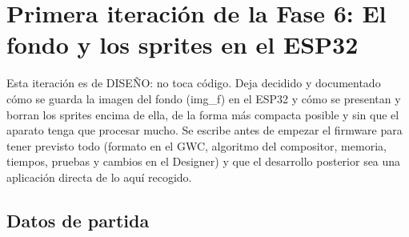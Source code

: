 \section{Primera iteración de la Fase 6: El fondo y los sprites en el ESP32}
\label{sec:F6I01}

Esta iteración es de DISEÑO: no toca código. Deja decidido y documentado cómo se guarda la imagen del fondo (img\_f) en el ESP32 y cómo se presentan y borran los sprites encima de ella, de la forma más compacta posible y sin que el aparato tenga que procesar mucho. Se escribe antes de empezar el firmware para tener previsto todo (formato en el GWC, algoritmo del compositor, memoria, tiempos, pruebas y cambios en el Designer) y que el desarrollo posterior sea una aplicación directa de lo aquí recogido.

\subsection{Datos de partida}
\label{sec:F6I01Datos}

